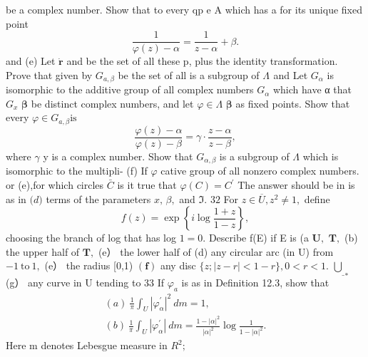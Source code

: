 be a complex number. Show that to every qp e A which has a for its unique fixed point $$ {\frac{1}{\varphi(z)-\alpha}}={\frac{1}{z-\alpha}}+\beta. $$ and (e) Let $\scriptstyle{\dot{\mathbf{r}}}$ and be the set of all these p, plus the identity transformation. Prove that given by $G_{a,\beta}$ be the set of all is a subgroup of $\Lambda^{}$ and Let $G_{\alpha}$ is isomorphic to the additive group of all complex numbers $G_{\alpha}$ which have α that $G_{x}$ $\boldsymbol{\beta}$ be distinct complex numbers, and let $\varphi\in\Lambda$ $\boldsymbol{\beta}$ as fixed points. Show that every $\varphi\in G_{a,\beta}{\mathrm{is}}$ $$ \frac{\varphi(z)-\alpha}{\varphi(z)-\beta}=\gamma\cdot\frac{z-\alpha}{z-\beta}, $$ where $\gamma$ y is a complex number. Show that $G_{\alpha,\beta}$ is a subgroup of $\Lambda$ which is isomorphic to the multipli- (f) If $\scriptstyle{\varphi}$ cative group of all nonzero complex numbers. or (e),for which circles $\scriptstyle{\bar{C}}$ is it true that $\varphi(C)=C^{\prime}$ The answer should be in is as in $\mathbf{(}d)$ terms of the parameters $x,\,\beta,$ and ${\mathfrak{I}}.$ $32$ For $z\in{\overline{{U}}},z^{2}\neq1,$ define $$ f(z)=\exp\left\{i\log{\frac{1+z}{1-z}}\right\}, $$ choosing the branch of log that has log $1=0.$ Describe f(E) if E is (a ${\boldsymbol{U}},$ ${\boldsymbol{T}},$ (b) the upper half of ${\boldsymbol{T}},$ (e） the lower half of (d) any circular arc (in U) from $-1{\mathrm{~to~}}1,$ (e） the radius [0,1) $\mathbf{(f)}$ any disc $\{z;|z-r|<1-r\},0<r<1.$ $\underline{{\bigcup}}_{*}$ (g） any curve in U tending to 33 If $\varphi_{a}$ is as in Definition 12.3, show that $$ \begin{array}{c}{{(a)\ \frac{1}{\pi}\displaystyle\int_{U}|\varphi_{\alpha}^{\prime}|^{2}\ d m=1,}}\\ {{(b)\ \frac{1}{\pi}\displaystyle\int_{U}|\varphi_{\alpha}^{\prime}|\ d m=\frac{1-|\alpha|^{2}}{|\alpha|^{2}}\log\frac{1}{1-|\alpha|^{2}}.}}\end{array} $$ Here m denotes Lebesgue measure in $R^{2}{\mathrm{;}}$